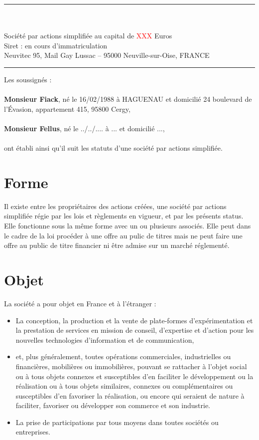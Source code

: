 \documentclass[a4paper,12pt]{report}
\newcommand{\address}{Neuvitec 95, Mail Gay Lussac -- 95000 Neuville-sur-Oise, FRANCE}
\begin{document}


\begin{center}
	\begin{minipage}{0.8\linewidth}
		\center
		\rule{\linewidth}{0.5mm}\\
		\large{}\\
		\normalsize
		Société par actions simplifiée au capital de \textcolor{red}{XXX} Euros\\
		Siret : en cours d'immatriculation\\
		\normalsize{\address}\\
		\rule{\linewidth}{0.5mm}
	\end{minipage}
\end{center}
\vspace{5mm}
\noindent Les soussignés :\\\\
\textbf{Monsieur Fiack}, né le 16/02/1988 à HAGUENAU et domicilié 24 boulevard de l'Évasion, appartement 415, 95800 Cergy,\\\\
\textbf{Monsieur Fellus}, né le ../../.... à ... et domicilié ...,\\\\
ont établi ainsi qu'il suit les statuts d'une société par actions simplifiée.

\section{Forme}
Il existe entre les propriétaires des actions créées, une société par actions simplifiée régie par les lois et règlements en vigueur, et par les présents status.
Elle fonctionne sous la même forme avec un ou plusieurs associés.
Elle peut dans le cadre de la loi procéder à une offre au pulic de titres mais ne peut faire une offre au public de titre financier ni être admise sur un marché réglementé.

\section{Objet}
La société a pour objet en France et à l'étranger :
\begin{itemize}
	\item La conception, la production et la vente de plate-formes d'expérimentation et la prestation de services en mission de conseil, d'expertise et d'action pour les nouvelles technologies d'information et de communication,
	\item et, plus généralement, toutes opérations commerciales, industrielles ou financières, mobilières ou immobilières,
		pouvant se rattacher à l'objet social ou à tous objets connexes et susceptibles d'en faciliter le développement ou la réalisation ou à tous objets similaires, 
		connexes ou complémentaires ou susceptibles d'en favoriser la réalisation, ou encore qui seraient de nature à faciliter, favoriser ou développer son commerce et son industrie.
	\item La prise de participations par tous moyens dans toutes sociétés ou entreprises.
\end{itemize}
\end{document}
